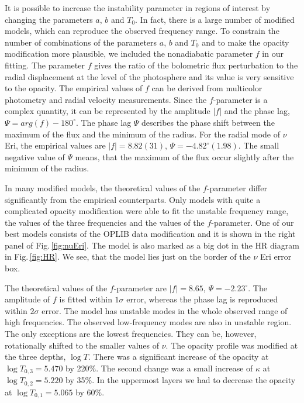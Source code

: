 \documentclass{ptapap}
\begin{document}
It is possible to increase the instability parameter in regions of interest by changing the parameters $a$, $b$ and $T_0$. In fact, there is a large number of modified models, which can reproduce the observed frequency range. To constrain the number of combinations of the parameters $a$, $b$ and $T_0$ and to make the opacity modification more plausible, we included  the nonadiabatic parameter $f$ in our fitting. The parameter $f$ gives the ratio of the bolometric flux perturbation to the radial displacement at the level of the photosphere \citep{JDD2003,JDD2005} and its value is very sensitive to the opacity. The empirical values of $f$ can be derived from multicolor photometry and radial velocity measurements. Since the $f$-parameter is a complex quantity, it can be represented by the amplitude $|f|$ and the phase lag, $\Psi=arg(f)-180^{\circ}$. The phase lag $\Psi$ describes the phase shift between the maximum of the flux and the minimum of the radius. For the radial mode of $\nu$ Eri, the empirical values are $|f|=8.82(31)$, $\Psi=-4.82^{\circ}(1.98)$.  The small negative value of $\Psi$ means, that the maximum of the flux occur slightly after the minimum of the radius.

In many modified models, the theoretical values of the $f$-parameter differ significantly from the empirical counterparts. Only models with quite a complicated opacity modification were able to fit the unstable frequency range, the values of the three frequencies and the values of the $f$-parameter. One of our best models consists of the OPLIB data modification and it is shown in the right panel of Fig.\,\ref{fig:nuEri}. The model is also marked as a big dot in the HR diagram in Fig.\,\ref{fig:HR}. We see, that the model lies just on the border of the $\nu$ Eri error box.

The theoretical values of the $f$-parameter are $|f|=8.65$, $\Psi=-2.23^{\circ}$. The amplitude of $f$ is fitted within $1\sigma$ error, whereas the phase lag is reproduced within $2\sigma$ error. The model has unstable modes in the whole observed range of high frequencies. The observed low-frequency modes are also in unstable region. The only exceptions are the lowest frequencies. They can be, however, rotationally shifted to the smaller values of $\nu$. The opacity profile was modified at the three depths, $\log{T}$. There was a significant increase of the opacity at $\log{T_{0,3}}=5.470$ by 220\%. The second change was a small increase of $\kappa$ at $\log{T_{0,2}}=5.220$ by 35\%. In the uppermost layers we had to decrease the opacity at $\log{T_{0,1}}=5.065$ by 60\%.
\end{document}
